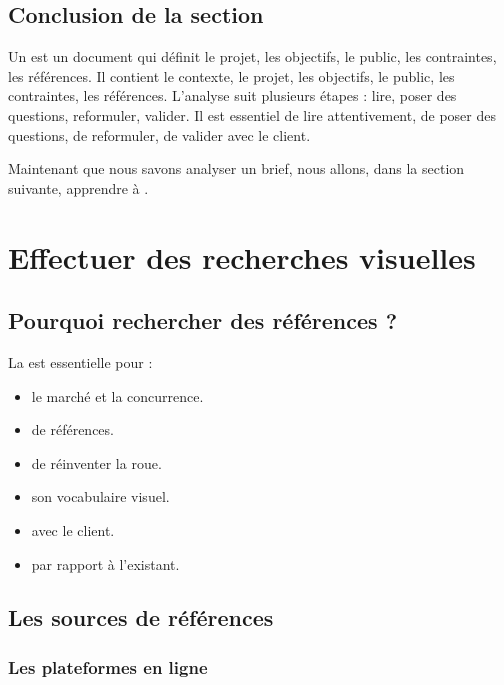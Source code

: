 \subsection*{Conclusion de la section}

Un  est un document qui définit le projet, les objectifs, le public, les contraintes, les références. Il contient le contexte, le projet, les objectifs, le public, les contraintes, les références. L'analyse suit plusieurs étapes : lire, poser des questions, reformuler, valider. Il est essentiel de lire attentivement, de poser des questions, de reformuler, de valider avec le client.

Maintenant que nous savons analyser un brief, nous allons, dans la section suivante, apprendre à .

\section{Effectuer des recherches visuelles}

\subsection{Pourquoi rechercher des références ?}

La  est essentielle pour :

\begin{itemize}
    \item {} le marché et la concurrence.
    \item {} de références.
    \item {} de réinventer la roue.
    \item {} son vocabulaire visuel.
    \item {} avec le client.
    \item {} par rapport à l'existant.
\end{itemize}

\subsection{Les sources de références}

\subsubsection{Les plateformes en ligne}

